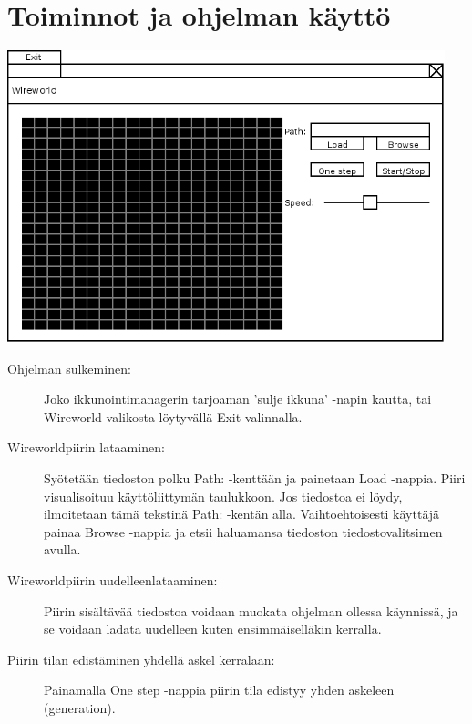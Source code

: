 \documentclass[a4paper,12pt]{article}
\begin{document}
\section{Toiminnot ja ohjelman käyttö}
\includegraphics[width=5in]{KayttoliittymaMaarittely.png}
\begin{description}
\item[Ohjelman sulkeminen:] Joko ikkunointimanagerin tarjoaman 'sulje ikkuna'
-napin kautta, tai Wireworld valikosta löytyvällä Exit valinnalla.
\end{description}

\begin{description}
\item[Wireworldpiirin lataaminen:] Syötetään tiedoston polku Path: -kenttään
ja painetaan Load -nappia. Piiri visualisoituu käyttöliittymän
taulukkoon. Jos tiedostoa ei löydy, ilmoitetaan tämä tekstinä Path:
-kentän alla.
Vaihtoehtoisesti käyttäjä painaa Browse -nappia ja etsii haluamansa
tiedoston tiedostovalitsimen avulla.
\end{description}

\begin{description}
\item[Wireworldpiirin uudelleenlataaminen:] Piirin sisältävää tiedostoa
voidaan muokata ohjelman ollessa käynnissä, ja se voidaan ladata
uudelleen kuten ensimmäiselläkin kerralla.
\end{description}

\begin{description}
\item[Piirin tilan edistäminen yhdellä askel kerralaan:] Painamalla One step
-nappia piirin tila edistyy yhden askeleen (generation).
\end{description}
\end{document}
